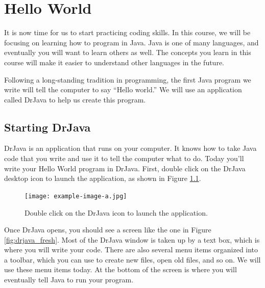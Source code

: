 \chapter{Hello World}

It is now time for us to start practicing coding skills. In this course, we will be focusing on learning how to program in Java. Java is one of many languages, and eventually you will want to learn others as well. The concepts you learn in this course will make it easier to understand other languages in the future.

Following a long-standing tradition in programming, the first Java program we write will tell the computer to say ``Hello world.'' We will use an application called DrJava to help us create this program.

\section{Starting DrJava}

DrJava is an application that runs on your computer. It knows how to take Java code that you write and use it to tell the computer what to do. Today you'll write your Hello World program in DrJava. First, double click on the DrJava desktop icon to launch the application, as shown in Figure \ref{fig:drjava_launch}.

\begin{figure}
    \centering
    \texttt{[image: example-image-a.jpg]}
    \caption{Double click on the DrJava icon to launch the application.}
    \label{fig:drjava_launch}
\end{figure}

Once DrJava opens, you should see a screen like the one in Figure \ref{fig:drjava_fresh}. Most of the DrJava window is taken up by a text box, which is where you will write your code. There are also several menu items organized into a toolbar, which you can use to create new files, open old files, and so on. We will use these menu items today. At the bottom of the screen is where you will eventually tell Java to run your program.

